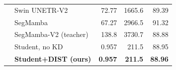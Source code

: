 \begin{table}[t]
{\begin{tabular}{@{}l l r r r@{}}
 & Swin UNETR-V2~\cite{sota2_brats} & 72.77 & 1665.6 & 89.39 \\
 & SegMamba~\cite{sota3_brats}      & 67.27 & 2966.5 & 91.32 \\
 & SegMamba-V2 (teacher)~\cite{xing2025segmambav2} & 138.8 & 3730.7 & 88.88 \\
 & Student, no KD                   & 0.957 & 211.5 & 88.95 \\
 & \textbf{Student+DIST (ours)}     & \textbf{0.957} & \textbf{211.5} & \textbf{88.96} \\
\bottomrule
\end{tabular}}
\ifdim\wd\resultsbox>\columnwidth
  \resizebox{\columnwidth}{!}{\usebox{\resultsbox}}%
\else
  \usebox{\resultsbox}%
\fi
\end{table}
